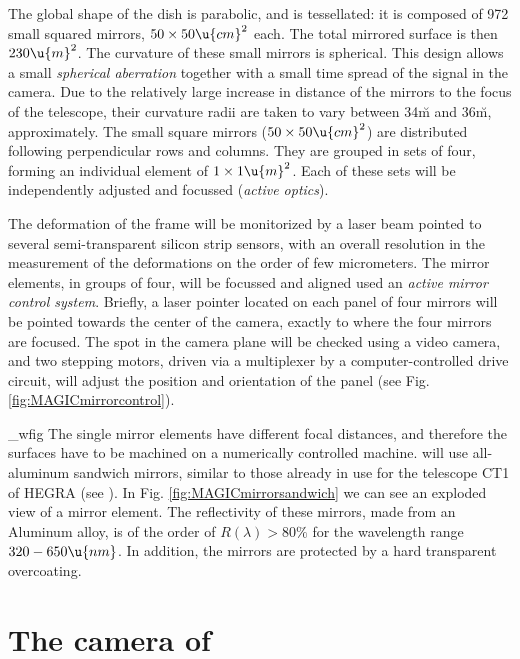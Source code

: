 The global shape of the dish is parabolic, and is tessellated: it is
composed of 972 small squared mirrors, $50\times 50 \u{cm}^2$ each.
The total mirrored surface is then $230\u{m}^2$. The curvature of
these small mirrors is spherical. This design allows a small
\emph{spherical aberration} together with a small time spread of the
signal in the camera. Due to the relatively large increase in distance
of the mirrors to the focus of the telescope, their curvature radii
are taken to vary between 34\u{m} and 36\u{m}, approximately.  The
small square mirrors ($50\times 50 \u{cm}^2$) are distributed
following perpendicular rows and columns. They are grouped in sets of
four, forming an individual element of $1\times 1 \u{m}^2$.  Each of
these sets will be independently adjusted and focussed (\emph{active
  optics}).

The deformation of the frame will be monitorized by a laser beam
pointed to several semi-transparent silicon strip sensors, with an
overall resolution in the measurement of the deformations on the order
of few micrometers. The mirror elements, in groups of four, will be
focussed and aligned used an \emph{active mirror control system}.
Briefly, a laser pointer located on each panel of four mirrors will be
pointed towards the center of the camera, exactly to where the four
mirrors are focused. The spot in the camera plane will be checked
using a video camera, and two stepping motors, driven via a
multiplexer by a computer-controlled drive circuit, will adjust the
position and orientation of the panel (see
Fig.\ref{fig:MAGICmirrorcontrol}).

\MAGICmirrorcontrol_wfig
%
The single mirror elements have different focal distances, and
therefore the surfaces have to be machined on a numerically controlled
machine. \MAGIC will use all-aluminum sandwich mirrors, similar to
those already in use for the telescope CT1 of HEGRA (see
). In Fig. \ref{fig:MAGICmirrorsandwich} we can
see an exploded view of a mirror element. The reflectivity of these
mirrors, made from an Aluminum alloy, is of the order of $R(\lambda)
> 80\%$ for the wavelength range $320-650\u{nm}$. In addition, the
mirrors are protected by a hard transparent overcoating.

\section{The camera of \MAGIC}
%
